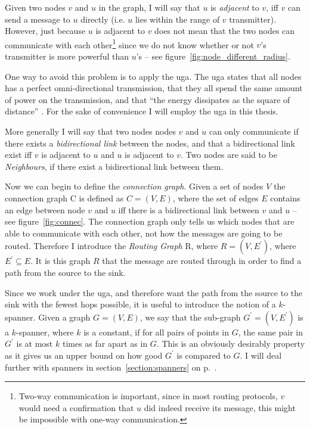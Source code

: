 
Given two nodes $v$ and $u$ in the graph, I will say that $u$ is \emph{adjacent} to $v$, iff $v$ can send a message to $u$ directly (i.e. $u$ lies within the range of $v$ transmitter). However, just because $u$ is adjacent to $v$ does not mean that the two nodes can communicate with each other\footnote{Two-way communication is important, since in most routing protocols, $v$ would need a confirmation that $u$ did indeed receive its message, this might be impossible with one-way communication.} since we do not know whether or not $v$'s transmitter is more powerful than $u$'s -- see figure~\ref{fig:node_different_radius}. 

One way to avoid this problem is to apply the \ac{uga}. The \ac{uga} states that all nodes has a perfect omni-directional transmission, that they all spend the same amount of power on the transmission, and that ``the energy dissipates as the square of distance'' \cite{practical}. For the sake of convenience I will employ the \ac{uga} in this thesis.\label{section:apply_uga}

More generally I will say that two nodes nodes $v$ and $u$ can only communicate if there exists a \emph{bidirectional link} between the nodes, and that a bidirectional link exist iff $v$ is adjacent to $u$ and $u$ is adjacent to $v$. Two nodes are said to be \emph{Neighbours}, if there exist a bidirectional link between them.

Now we can begin to define the \emph{connection graph}. Given a set of nodes $V$ the connection graph C is defined as $C = (V, E)$, where the set of edges $E$ contains an edge between node $v$ and $u$ iff there is a bidirectional link between $v$ and $u$ -- see figure~\ref{fig:connec}. The connection graph only tells us which nodes that are able to communicate with each other, not how the messages are going to be routed. Therefore I introduce the \emph{Routing Graph} R, where $R = (V, E^{\prime})$, where $E^{\prime} \subseteq E$. It is this graph $R$ that the message are routed through in order to find a path from the source to the sink.

Since we work under the \ac{uga}, and therefore want the path from the source to the sink with the fewest hops possible, it is useful to introduce the notion of a $k$-spanner. Given a graph $G = (V, E)$, we say that the sub-graph $G^{\prime} = (V, E^{\prime})$ is a $k$-spanner, where $k$ is a constant, if for all pairs of points in $G$, the same pair in $G^{\prime}$ is at most $k$ times as far apart as in $G$. This is an obviously desirably property as it gives us an upper bound on how good $G^{\prime}$ is compared to $G$. I will deal further with spanners in section~\ref{section:spanners} on p.~\pageref{section:spanners}.

